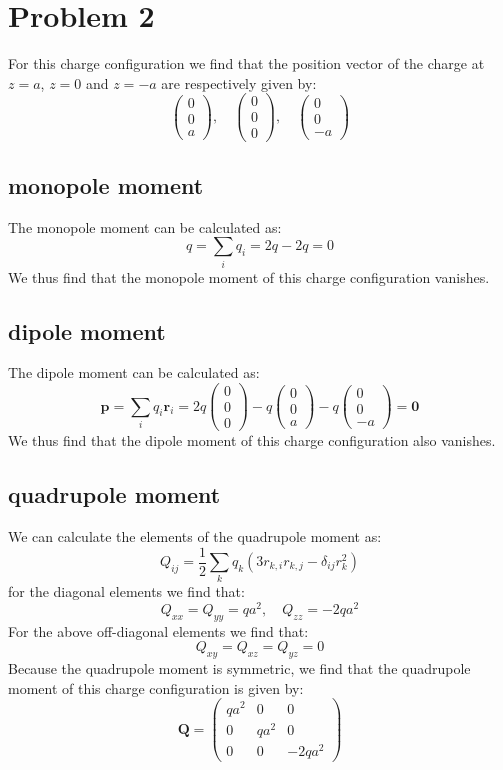 \documentclass[11pt,a4paper]{article}
\begin{document}
\section*{Problem 2}
For this charge configuration we find that the position vector of the charge at $z=a$, $z=0$ and $z=-a$ are respectively given by:
\[
\left(\begin{matrix}
    0\\0\\a
\end{matrix}\right), \quad
\left(\begin{matrix}
    0\\0\\0
\end{matrix}\right), \quad
\left(\begin{matrix}   
    0\\0\\-a
\end{matrix}\right)
\]

\subsection*{monopole moment}
The monopole moment can be calculated as:
\[
q=\sum_i q_i = 2q - 2q = 0
\]
We thus find that the monopole moment of this charge configuration vanishes.
\subsection*{dipole moment}
The dipole moment can be calculated as:
\[
\mathbf{p}=\sum_i q_i \mathbf{r}_i = 2q\left(\begin{matrix}
    0\\0\\0
\end{matrix}\right) - q\left(\begin{matrix}
    0\\0\\a
\end{matrix}\right) - q\left(\begin{matrix}
    0\\0\\-a
\end{matrix}\right)  = \mathbf{0}
\]
We thus find that the dipole moment of this charge configuration also vanishes.
\subsection*{quadrupole moment}
We can calculate the elements of the quadrupole moment as:
\[
Q_{ij}=\frac{1}{2}\sum_k q_k (3r_{k,i}r_{k,j}-\delta_{ij}r_k^2)
\]
for the diagonal elements we find that:
\[
Q_{xx} = Q_{yy} = qa^2, \quad Q_{zz} = -2qa^2
\]
For the above off-diagonal elements we find that:
\[Q_{xy} = Q_{xz} = Q_{yz} = 0
\]
Because the quadrupole moment is symmetric, we find that the quadrupole moment of this charge configuration is given by:
\[\mathbf{Q} = \left(\begin{matrix}
    qa^2 & 0 & 0\\
    0 & qa^2 & 0\\
    0 & 0 & -2qa^2
\end{matrix}\right)
\]
\end{document}
